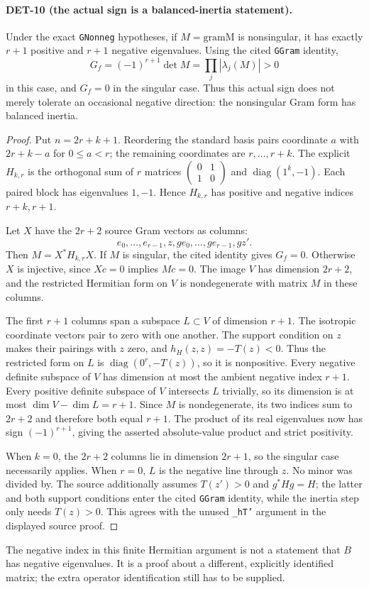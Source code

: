 \documentclass[11pt,a4paper]{article}
\newcommand{\diag}{\operatorname{diag}}
\begin{document}
\paragraph{DET-10 (the actual sign is a balanced-inertia statement).}
Under the exact \texttt{GNonneg} hypotheses, if $M=\mathrm{gramM}$ is nonsingular, it has exactly $r+1$ positive and $r+1$ negative eigenvalues. Using the cited \texttt{GGram} identity,
\[
 G_f=(-1)^{r+1}\det M=\prod_j|\lambda_j(M)|>0
\]
in this case, and $G_f=0$ in the singular case. Thus this actual sign does not merely tolerate an occasional negative direction: the nonsingular Gram form has balanced inertia.
\begin{proof}
Put $n=2r+k+1$. Reordering the standard basis pairs coordinate $a$ with $2r+k-a$ for $0\le a<r$; the remaining coordinates are $r,\ldots,r+k$. The explicit $H_{k,r}$ is the orthogonal sum of $r$ matrices $\left(\begin{smallmatrix}0&1\\1&0\end{smallmatrix}\right)$ and $\diag(1^k,-1)$. Each paired block has eigenvalues $1,-1$. Hence $H_{k,r}$ has positive and negative indices $r+k,r+1$.

Let $X$ have the $2r+2$ source Gram vectors as columns:
\[e_0,\ldots,e_{r-1},z,ge_0,\ldots,ge_{r-1},gz'.\]
Then $M=X^*H_{k,r}X$. If $M$ is singular, the cited identity gives $G_f=0$. Otherwise $X$ is injective, since $Xc=0$ implies $Mc=0$. The image $V$ has dimension $2r+2$, and the restricted Hermitian form on $V$ is nondegenerate with matrix $M$ in these columns.

The first $r+1$ columns span a subspace $L\subset V$ of dimension $r+1$. The isotropic coordinate vectors pair to zero with one another. The support condition on $z$ makes their pairings with $z$ zero, and $h_H(z,z)=-T(z)<0$. Thus the restricted form on $L$ is $\diag(0^r,-T(z))$, so it is nonpositive. Every negative definite subspace of $V$ has dimension at most the ambient negative index $r+1$. Every positive definite subspace of $V$ intersects $L$ trivially, so its dimension is at most $\dim V-\dim L=r+1$. Since $M$ is nondegenerate, its two indices sum to $2r+2$ and therefore both equal $r+1$. The product of its real eigenvalues now has sign $(-1)^{r+1}$, giving the asserted absolute-value product and strict positivity.

When $k=0$, the $2r+2$ columns lie in dimension $2r+1$, so the singular case necessarily applies. When $r=0$, $L$ is the negative line through $z$. No minor was divided by. The source additionally assumes $T(z')>0$ and $g^*Hg=H$; the latter and both support conditions enter the cited \texttt{GGram} identity, while the inertia step only needs $T(z)>0$. This agrees with the unused \texttt{\_hT'} argument in the displayed source proof.
\end{proof}
The negative index in this finite Hermitian argument is not a statement that $B$ has negative eigenvalues. It is a proof about a different, explicitly identified matrix; the extra operator identification still has to be supplied.
\end{document}
